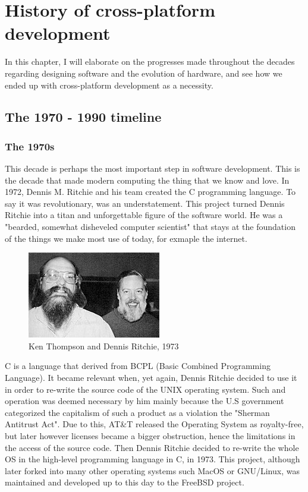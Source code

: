 \chapter{History of cross-platform development}
\label{chap:ch1}

\indent

\par
In this chapter, I will elaborate on the progresses made throughout the decades regarding designing software and the evolution of hardware, and see how we ended up with cross-platform development as a necessity.


\section{The 1970 - 1990 timeline}

\subsection{The 1970s}
This decade is perhaps the most important step in software development.
This is the decade that made modern computing the thing that we know and love.
In 1972, Dennis M.
Ritchie and his team created the C programming language.
To say it was revolutionary, was an understatement.
This project turned Dennis Ritchie into a titan and unforgettable figure of the software world.
He was a "bearded, somewhat disheveled computer scientist"\cite{ritchieJobs} that stays at the foundation of the things we make most use of today, for exmaple the internet.
\begin{figure}[htbp]
    \centering
    \includegraphics[scale=0.7]{pictures/KenThompson_and_DennisRitchie1973.jpg}
    \caption{Ken Thompson and Dennis Ritchie, 1973}
    \label{unixMakers}
\end{figure}

\par
C is a language that derived from BCPL (Basic Combined Programming Language).
It became relevant when, yet again, Dennis Ritchie decided to use it in order to re-write the source code of the UNIX operating system.
Such and operation was deemed necessary by him mainly because the U.S government categorized the capitalism of such a product as a violation the "Sherman Antitrust Act"\cite{unixRepo}.
Due to this, AT\&T released the Operating System as royalty-free, but later however licenses became a bigger obstruction, hence the limitations in the access of the source code.
Then Dennis Ritchie decided to re-write the whole OS in the high-level programming language in C, in 1973.
This project, although later forked into many other operating systems such MacOS or GNU/Linux, was maintained and developed up to this day to the FreeBSD project.

